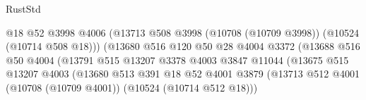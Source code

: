 \begin{lexlean}{RustStd}
\begin{coremodule}
                                                @18
                                                @52
                                                @3998
                                                @4006
                                                (@13713
                                                  @508
                                                  @3998
                                                  (@10708 (@10709 @3998))
                                                  (@10524 (@10714 @508 @18)))
                                                (@13680
                                                  @516
                                                  @120
                                                  @50
                                                  @28
                                                  @4004
                                                  @3372
                                                  (@13688
                                                    @516
                                                    @50
                                                    @4004
                                                    (@13791
                                                      @515
                                                      @13207
                                                      @3378
                                                      @4003
                                                      @3847
                                                      @11044
                                                      (@13675
                                                        @515
                                                        @13207
                                                        @4003
                                                        (@13680
                                                          @513
                                                          @391
                                                          @18
                                                          @52
                                                          @4001
                                                          @3879
                                                          (@13713
                                                            @512
                                                            @4001
                                                            (@10708 (@10709 @4001))
                                                            (@10524 (@10714 @512 @18)))

\end{coremodule}
\end{lexlean}

